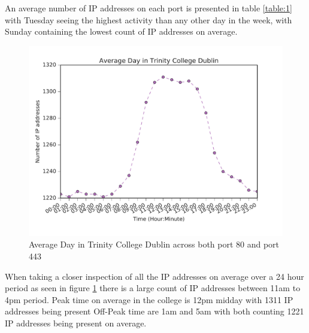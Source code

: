 \documentclass[a4wide,leqno,12pt]{report}
\begin{document}
An average number of IP addresses on each port is presented in table \ref{table:1} with Tuesday seeing the highest activity than any other day in the week, with Sunday containing the lowest count of IP addresses on average.

\begin{figure}[H]
\centering
\includegraphics[scale=.5]{pdf_images/AverageDayinTrinityCollegeDublin}
\caption{Average Day in Trinity College Dublin across both port 80 and port 443}
\label{fig:average_day}
\end{figure}
When taking a closer inspection of all the IP addresses on average over a 24 hour period as seen in figure \ref{fig:average_day} there is a large count of IP addresses between 11am to 4pm period. Peak time on average in the college is 12pm midday with 1311 IP addresses being present
Off-Peak time are 1am and 5am with both counting 1221 IP addresses being present on average.
 
\end{document}
